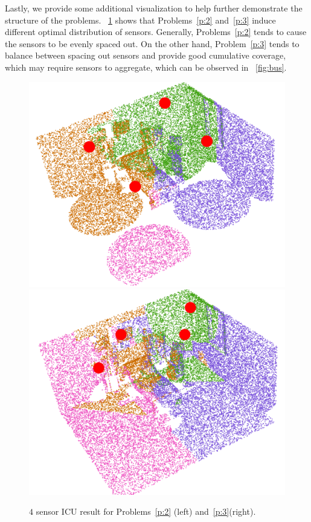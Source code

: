 
Lastly, we provide some additional visualization to help further demonstrate the structure of the problems. ~\ref{fig:icu-comp} shows that Problems~\ref{p:2} and~\ref{p:3} induce different optimal distribution of sensors. Generally, Problems~\ref{p:2} tends to cause the sensors to be evenly spaced out. On the other hand, Problem~\ref{p:3} tends to balance between spacing out sensors and provide good cumulative coverage, which may require sensors to aggregate, which can be observed in ~\ref{fig:bus}.

\begin{figure}[!ht]
\vspace{1mm}
    \centering
    \includegraphics[width = 0.35\columnwidth]{chapters/surf/fig/icu-2-4.png}\hspace{3mm}
    \includegraphics[width = 0.35\columnwidth]{chapters/surf/fig/icu-3-4.png}
\vspace{1mm}
    \caption{$4$ sensor ICU result for Problems~\ref{p:2} (left) and~\ref{p:3}(right).}
    \label{fig:icu-comp}
\end{figure}

